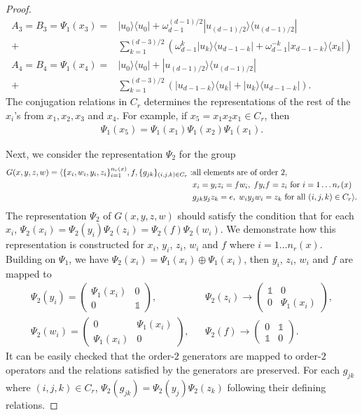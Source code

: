 \documentclass[11pt,letterpaper]{article}
\newcommand{\ketbra}[2]{|#1\rangle\langle#2|}
\DeclarePairedDelimiter{\ip}{\langle}{\rangle}
\newcommand{\1}{\mathbb{1}}
\theoremstyle{definition}
\begin{document}
\begin{proof}
\begin{align*}
	A_3 = B_3 =\Psi_1(x_3) = &\ketbra{u_0}{u_0} +\omega_{d-1}^{(d-1)/2}\ketbra{u_{(d-1)/2}}{u_{(d-1)/2}}\\ + 
	&\sum_{k=1}^{(d-3)/2}\left( \omega_{d-1}^k\ketbra{u_k}{u_{d-1-k}} + \omega_{d-1}^{-k}\ketbra{x_{d-1-k}}{x_k}\right)\\ 
	A_4 = B_4  =\Psi_1(x_4) = &\ketbra{u_0}{u_0} +\ketbra{u_{(d-1)/2}}{u_{(d-1)/2}} \\+
	 &\sum_{k=1}^{(d-3)/2}\left(\ketbra{u_{d-1-k}}{u_k} + \ketbra{u_k}{u_{d-1-k}}\right).
\end{align*}
The conjugation relations in $C_r$ determines the representations of 
the rest of the $x_i$'s from $x_1,x_2,x_3$ and $x_4$. 
For example, if $x_5 = x_1x_2x_1 \in C_r$, then
\begin{align}
	\Psi_1(x_5) = \Psi_1(x_1)\Psi_1(x_2) \Psi_1(x_1).
\end{align}

Next, we consider the representation $\Psi_2$ for the group 
\begin{align*}
	G(x,y,z,w) = \ip{ \{x_i, w_i, y_i, z_i\}_{i=1}^{n_r(x)}, f, \{g_{jk}\}_{(i,j,k) \in C_r} :&\text{all elements are of order $2$},\\
	&x_i = y_iz_i = fw_i,\; fy_if =z_i \text{ for } i= 1 \dots n_r(x) \\
	&g_{jk}y_j z_k = e,\; w_iy_jw_i = z_k \text{ for all } (i,j,k)\in C_r}.
\end{align*}
The representation $\Psi_2$ of $G(x,y,z,w)$ should satisfy the condition that for each $x_i$, 
$\Psi_2(x_i) = \Psi_2(y_i)\Psi_2(z_i) = \Psi_2(f)\Psi_2(w_i)$. We demonstrate how this representation is constructed 
for $x_i$, $y_i$, $z_i$, $w_i$ and $f$ where $i = 1 \dots n_r(x)$.
Building on $\Psi_1$, we have $\Psi_2(x_i) = \Psi_1(x_i) \oplus \Psi_1(x_i)$, then
$y_i$, $z_i$, $w_i$ and $f$ are mapped to
\begin{align*}
\Psi_2(y_i) = 
\begin{pmatrix}
\Psi_1(x_i) & 0\\
0 & \1
\end{pmatrix},
&&
\Psi_2(z_i) \to
\begin{pmatrix}
\1 & 0\\
0 & \Psi_1(x_i)
\end{pmatrix},
\\
\Psi_2(w_i) = 
\begin{pmatrix}
0 & \Psi_1(x_i)\\
\Psi_1(x_i) & 0
\end{pmatrix},
&&
\Psi_2(f) \to
\begin{pmatrix}
0 & \1\\
\1 & 0
\end{pmatrix}.
\end{align*}
It can be easily checked that the order-$2$ generators are mapped to order-$2$ operators and
the relations satisfied by the generators are preserved.
For each $g_{jk}$ where $(i,j,k) \in C_r$, $\Psi_2(g_{jk}) = \Psi_2(y_j)\Psi_2(z_k)$ following
their defining relations. 


\end{proof}
\end{document}
